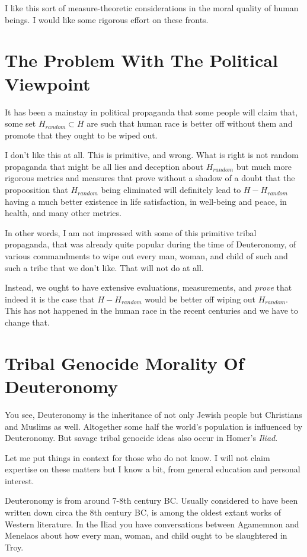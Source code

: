 \documentclass{amsart}
\begin{document}
I like this sort of measure-theoretic considerations in the moral quality of human beings.  I would like some rigorous effort on these fronts.  

\section{The Problem With The Political Viewpoint}

It has been a mainstay in political propaganda that some people will claim that, some set $H_{random} \subset H$ are such that human race is better off without them and promote that they ought to be wiped out.


I don't like this at all.  This is primitive, and wrong.  What is right is not random propaganda that might be all lies and deception about $H_{random}$ but much more rigorous metrics and measures that prove without a shadow of a doubt that the propoosition that $H_{random}$ being eliminated will definitely lead to $H-H_{random}$ having a much better existence in life satisfaction, in well-being and peace, in health, and many other metrics.

In other words, I am not impressed with some of this primitive tribal propaganda, that was already quite popular during the time of Deuteronomy, of various commandments to wipe out every man, woman, and child of such and such a tribe that we don't like.  That will not do at all.

Instead, we ought to have extensive evaluations, measurements, and {\em prove} that indeed it is the case that $H-H_{random}$ would be better off wiping out $H_{random}$.  This has not happened in the human race in the recent centuries and we have to change that.

\section{Tribal Genocide Morality Of Deuteronomy}

You see, Deuteronomy is the inheritance of not only Jewish people but Christians and Muslims as well.  Altogether some half the world's population is influenced by Deuteronomy.  But savage tribal genocide ideas also occur in Homer's {\em Iliad}.  

Let me put things in context for those who do not know. I will not claim expertise on these matters but I know a bit, from general education and personal interest.

Deuteronomy is from around 7-8th century BC.  Usually considered to have been written down circa the 8th century BC, is among the oldest extant works of Western literature.  In the Iliad you have conversations between Agamemnon and Menelaos about how every man, woman, and child ought to be slaughtered in Troy.
\end{document}
